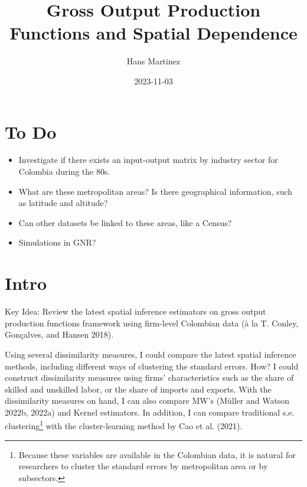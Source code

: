 \documentclass[
]{article}
\title{Gross Output Production Functions and Spatial Dependence}
\author{Hans Martinez}
\date{2023-11-03}
\providecommand{\tightlist}{%
  \setlength{\itemsep}{0pt}\setlength{\parskip}{0pt}}\usepackage{longtable,booktabs,array}
\begin{document}
\maketitle
\ifdefined\Shaded\renewenvironment{Shaded}{\begin{tcolorbox}[breakable, enhanced, interior hidden, frame hidden, sharp corners, boxrule=0pt, borderline west={3pt}{0pt}{shadecolor}]}{\end{tcolorbox}}\fi

\hypertarget{to-do}{%
\section*{To Do}\label{to-do}}

\begin{itemize}
\tightlist
\item
  Investigate if there exists an input-output matrix by industry sector
  for Colombia during the 80s.
\item
  What are these metropolitan areas? Is there geographical information,
  such as latitude and altitude?
\item
  Can other datasets be linked to these areas, like a Census?
\item
  Simulations in GNR?
\end{itemize}

\hypertarget{intro}{%
\section*{Intro}\label{intro}}

Key Idea: Review the latest spatial inference estimators on gross output
production functions framework using firm-level Colombian data (à la T.
Conley, Gonçalves, and Hansen 2018).

Using several dissimilarity measures, I could compare the latest spatial
inference methods, including different ways of clustering the standard
errors. How? I could construct dissimilarity measures using firms'
characteristics such as the share of skilled and unskilled labor, or the
share of imports and exports. With the dissimilarity measures on hand, I
can also compare MW's (Müller and Watson 2022b, 2022a) and Kernel
estimators. In addition, I can compare traditional s.e.
clustering\footnote{Because these variables are available in the
  Colombian data, it is natural for researchers to cluster the standard
  errors by metropolitan area or by subsectors.} with the
cluster-learning method by Cao et al. (2021).
\end{document}
